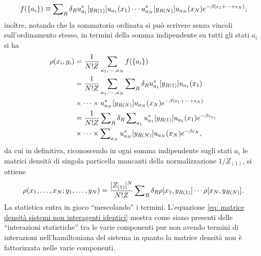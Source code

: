 \begin{equation}
    f(\{a_i\}) \equiv \sum\nolimits_{R}\delta_Ru_{a_1}^*[y_{R(1)}]u_{a_1}(x_1)\cdots u_{a_N}^*[y_{R(N)}]u_{a_N}(x_N)e^{-\beta(\epsilon_1+\cdots+\epsilon_N)};
\end{equation}
inoltre, notando che la sommatoria ordinata si può scrivere senza vincoli sull'ordinamento stesso, in termini della somma indipendente su tutti gli stati $a_i$ si ha
\begin{equation}
    \begin{split}
        \rho(x_i,y_i) &= \frac{1}{N!Z}\sum_{a_1,\cdots,a_N}f(\{a_i\}) \\
        &= \frac{1}{N!Z}\sum_{a_1,\cdots,a_N}\sum\nolimits_{R}\delta_Ru_{a_1}^*[y_{R(1)}]u_{a_1}(x_1)\\
        &\times\cdots\times u_{a_N}^*[y_{R(N)}]u_{a_N}(x_N)e^{-\beta(\epsilon_1+\cdots+\epsilon_N)} \\
        &= \frac{1}{N!Z}\sum\nolimits_{R}\delta_R\sum\nolimits_{a_1}u_{a_1}^*[y_{R(1)}]u_{a_1}(x_1)e^{-\beta\epsilon_{a_1}}\\
        &\times\cdots\times\sum\nolimits_{a_N}u_{a_N}^*[y_{R(N)}]u_{a_N}(x_N)e^{-\beta\epsilon_N},
    \end{split}
\end{equation}
da cui in definitiva, riconoscendo in ogni somma indipendente sugli stati $a_i$ le matrici densità di singola particella mancanti della normalizzazione $1/Z_{(1)}$, si ottiene
\begin{equation}
\label{eq: matrice densità sistemi non interagenti identici}
    \rho(x_1,\dots,x_N;y_1,\dots,y_N) = \frac{[Z_{(1)}]^N}{N!Z}\sum\nolimits_R\delta_R\rho[x_1,y_{R(1)}]\cdots\rho[x_N,y_{R(N)}].
\end{equation}
La statistica entra in gioco ``mescolando'' i termini. L'equazione \eqref{eq: matrice densità sistemi non interagenti identici} mostra come siano presenti delle ``interazioni statistiche'' tra le varie componenti pur non avendo termini di interazioni nell'hamiltoniana del sistema in quanto la matrice densità non è fattorizzata nelle varie componenti. 

